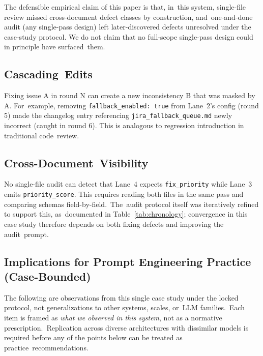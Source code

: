 \documentclass[software,article,accept,pdftex,oneauthor]{Definitions/mdpi}
\begin{document}
The defensible empirical claim of this paper is that, in~this system, single-file review missed cross-document defect classes by construction, and~one-and-done audit (any single-pass design) left later-discovered defects unresolved under the case-study protocol. We do not claim that no full-scope single-pass design could in principle have surfaced~them.

\subsection{Cascading~Edits}
\label{subsec:cascading}

Fixing issue A in round N can create a new inconsistency B that was masked by A. For~example, removing \texttt{fallback\_enabled: true} from Lane~2's config (round 5) made the changelog entry referencing \texttt{jira\_fallback\_queue.md} newly incorrect (caught in round 6). This is analogous to regression introduction in traditional code~review.

\subsection{Cross-Document~Visibility}

No single-file audit can detect that Lane~4 expects \texttt{fix\_priority} while Lane~3 emits \texttt{priority\_score}. This requires reading both files in the same pass and comparing schemas field-by-field.~The~audit protocol itself was iteratively refined to support this, as~documented in Table~\ref{tab:chronology}; convergence in this case study therefore depends on both fixing defects and improving the audit~prompt.

\subsection{Implications for Prompt Engineering Practice (Case-Bounded)}

The following are observations from this single case study under the locked protocol, not generalizations to other systems, scales, or~LLM families.~Each item is framed as \emph{what we observed in this system}, not as a normative prescription.~Replication across diverse architectures with dissimilar models is required before any of the points below can be treated as practice~recommendations.
\end{document}
